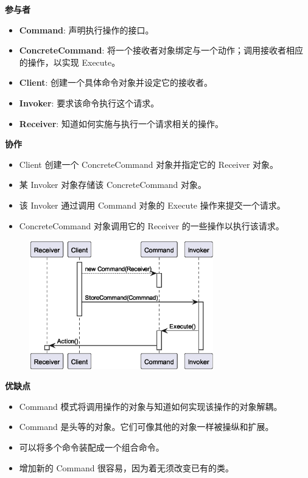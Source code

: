 \noindent\textbf{参与者}

\begin{itemize}
    \item \textbf{Command}: 声明执行操作的接口。
    \item \textbf{ConcreteCommand}: 将一个接收者对象绑定与一个动作；调用接收者相应的操作，以实现 Execute。
    \item \textbf{Client}: 创建一个具体命令对象并设定它的接收者。
    \item \textbf{Invoker}: 要求该命令执行这个请求。
    \item \textbf{Receiver}: 知道如何实施与执行一个请求相关的操作。
\end{itemize}

\noindent\textbf{协作}

\begin{itemize}
    \item Client 创建一个 ConcreteCommand 对象并指定它的 Receiver 对象。
    \item 某 Invoker 对象存储该 ConcreteCommand 对象。
    \item 该 Invoker 通过调用 Command 对象的 Execute 操作来提交一个请求。
    \item ConcreteCommand 对象调用它的 Receiver 的一些操作以执行该请求。
\end{itemize}

\begin{figure}[H] 
    \centering 
    \includegraphics[width=8cm]{figures/Command.eps} 
\end{figure}

\noindent\textbf{优缺点}

\begin{itemize}
    \item Command 模式将调用操作的对象与知道如何实现该操作的对象解耦。
    \item Command 是头等的对象。它们可像其他的对象一样被操纵和扩展。
    \item 可以将多个命令装配成一个组合命令。
    \item 增加新的 Command 很容易，因为着无须改变已有的类。
\end{itemize}

